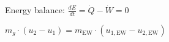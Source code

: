 Energy balance:  
\( \frac{dE}{dt} = \dot{Q} - \dot{W} = 0 \)  

\( m_g \cdot (u_2 - u_1) = m_{\text{EW}} \cdot (u_{1,\text{EW}} - u_{2,\text{EW}}) \)